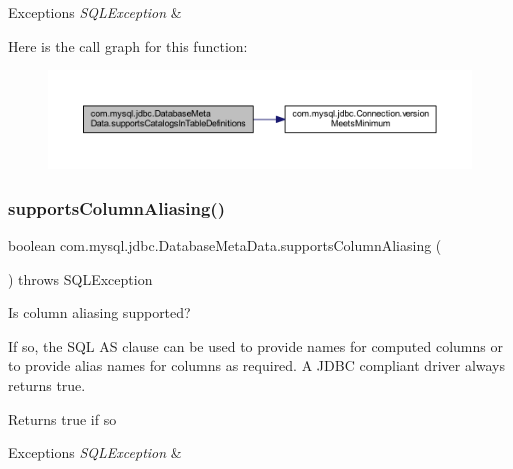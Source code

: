 \begin{DoxyExceptions}{Exceptions}
{\em S\+Q\+L\+Exception} & \\
\hline
\end{DoxyExceptions}
Here is the call graph for this function\+:
\nopagebreak
\begin{figure}[H]
\begin{center}
\leavevmode
\includegraphics[width=350pt]{classcom_1_1mysql_1_1jdbc_1_1_database_meta_data_ad1931a1639f961d1267157b1ec54e8a3_cgraph}
\end{center}
\end{figure}
\mbox{\label{classcom_1_1mysql_1_1jdbc_1_1_database_meta_data_a0246c334d5fa36d44d0cd213fb925448}} 
\subsubsection{\texorpdfstring{supports\+Column\+Aliasing()}{supportsColumnAliasing()}}
{\footnotesize\ttfamily boolean com.\+mysql.\+jdbc.\+Database\+Meta\+Data.\+supports\+Column\+Aliasing (\begin{DoxyParamCaption}{ }\end{DoxyParamCaption}) throws S\+Q\+L\+Exception}

Is column aliasing supported? 

If so, the S\+QL AS clause can be used to provide names for computed columns or to provide alias names for columns as required. A J\+D\+BC compliant driver always returns true. 

\begin{DoxyReturn}{Returns}
true if so 
\end{DoxyReturn}

\begin{DoxyExceptions}{Exceptions}
{\em S\+Q\+L\+Exception} & \\
\hline
\end{DoxyExceptions}
\mbox{\label{classcom_1_1mysql_1_1jdbc_1_1_database_meta_data_a3a707d694f45b20e788247a916abbfcc}} 

